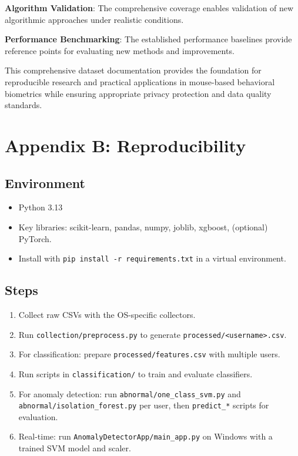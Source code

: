 \documentclass[
  12pt,
  a4paper,
]{report}
\providecommand{\tightlist}{%
  \setlength{\itemsep}{0pt}\setlength{\parskip}{0pt}}
\begin{document}
\textbf{Algorithm Validation}: The comprehensive coverage enables
validation of new algorithmic approaches under realistic conditions.

\textbf{Performance Benchmarking}: The established performance baselines
provide reference points for evaluating new methods and improvements.

This comprehensive dataset documentation provides the foundation for
reproducible research and practical applications in mouse-based
behavioral biometrics while ensuring appropriate privacy protection and
data quality standards.

\chapter{Appendix B: Reproducibility}\label{appendix-b-reproducibility}

\section{Environment}\label{environment}

\begin{itemize}
\tightlist
\item
  Python 3.13
\item
  Key libraries: scikit-learn, pandas, numpy, joblib, xgboost,
  (optional) PyTorch.
\item
  Install with \texttt{pip\ install\ -r\ requirements.txt} in a virtual
  environment.
\end{itemize}

\section{Steps}\label{steps}

\begin{enumerate}
\def\labelenumi{\arabic{enumi}.}
\tightlist
\item
  Collect raw CSVs with the OS-specific collectors.
\item
  Run \texttt{collection/preprocess.py} to generate
  \texttt{processed/\textless{}username\textgreater{}.csv}.
\item
  For classification: prepare \texttt{processed/features.csv} with
  multiple users.
\item
  Run scripts in \texttt{classification/} to train and evaluate
  classifiers.
\item
  For anomaly detection: run \texttt{abnormal/one\_class\_svm.py} and
  \texttt{abnormal/isolation\_forest.py} per user, then
  \texttt{predict\_*} scripts for evaluation.
\item
  Real-time: run \texttt{AnomalyDetectorApp/main\_app.py} on Windows
  with a trained SVM model and scaler.
\end{enumerate}
\end{document}
